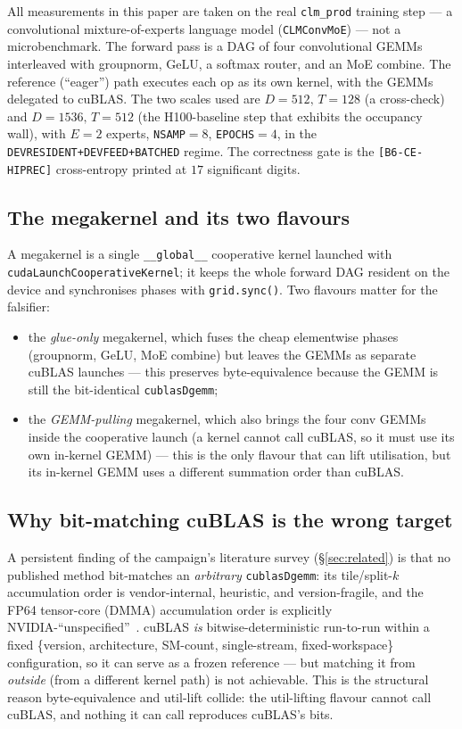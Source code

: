 \documentclass[11pt,a4paper]{article}
\begin{document}
All measurements in this paper are taken on the real \texttt{clm\_prod}
training step --- a convolutional mixture-of-experts language model
(\texttt{CLMConvMoE}) --- not a microbenchmark. The forward pass is a DAG
of four convolutional GEMMs interleaved with groupnorm, GeLU, a softmax
router, and an MoE combine. The reference (``eager'') path executes each op
as its own kernel, with the GEMMs delegated to cuBLAS. The two scales used
are $D{=}512,\,T{=}128$ (a cross-check) and $D{=}1536,\,T{=}512$ (the
H100-baseline step that exhibits the occupancy wall), with $E{=}2$ experts,
\texttt{NSAMP}$=8$, \texttt{EPOCHS}$=4$, in the
\texttt{DEVRESIDENT+DEVFEED+BATCHED} regime. The correctness gate is the
\texttt{[B6-CE-HIPREC]} cross-entropy printed at $17$ significant digits.

\subsection{The megakernel and its two flavours}

A megakernel is a single \verb|__global__| cooperative kernel launched with
\texttt{cudaLaunchCooperativeKernel}; it keeps the whole forward DAG
resident on the device and synchronises phases with \texttt{grid.sync()}.
Two flavours matter for the falsifier:
\begin{itemize}\itemsep0.2em
\item the \emph{glue-only} megakernel, which fuses the cheap elementwise
phases (groupnorm, GeLU, MoE combine) but leaves the GEMMs as separate
cuBLAS launches --- this preserves byte-equivalence because the GEMM is
still the bit-identical \texttt{cublasDgemm};
\item the \emph{GEMM-pulling} megakernel, which also brings the four conv
GEMMs inside the cooperative launch (a kernel cannot call cuBLAS, so it must
use its own in-kernel GEMM) --- this is the only flavour that can lift
utilisation, but its in-kernel GEMM uses a different summation order than
cuBLAS.
\end{itemize}

\subsection{Why bit-matching cuBLAS is the wrong target}
\label{sec:bg-cublas}

A persistent finding of the campaign's literature survey
(\S\ref{sec:related}) is that no published method bit-matches an
\emph{arbitrary} \texttt{cublasDgemm}: its tile/split-$k$ accumulation order
is vendor-internal, heuristic, and version-fragile, and the FP64
tensor-core (DMMA) accumulation order is explicitly
NVIDIA-``unspecified''~\citep{nvidia2024cublas}. cuBLAS \emph{is}
bitwise-deterministic run-to-run within a fixed
\{version, architecture, SM-count, single-stream, fixed-workspace\}
configuration, so it can serve as a frozen reference --- but matching it
from \emph{outside} (from a different kernel path) is not achievable. This
is the structural reason byte-equivalence and util-lift collide: the
util-lifting flavour cannot call cuBLAS, and nothing it can call reproduces
cuBLAS's bits.
\end{document}
